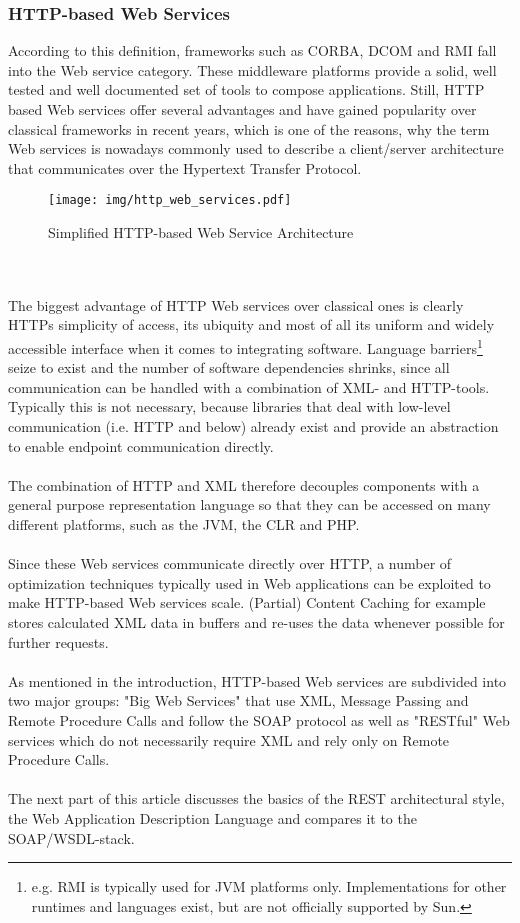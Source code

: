 \subsubsection*{HTTP-based Web Services}
According to this definition, frameworks such as CORBA, DCOM and RMI fall into the Web service category. These middleware platforms provide a solid, well tested and well documented set of tools to compose applications. Still, HTTP based Web services offer several advantages and have gained popularity over classical frameworks in recent years, which is one of the reasons, why the term Web services is nowadays commonly used to describe a client/server architecture that communicates over the Hypertext Transfer Protocol.
\begin{figure}[htp]
\centering
\texttt{[image: img/http\_web\_services.pdf]}
\caption{Simplified HTTP-based Web Service Architecture}\label{fig:erptsqfit}
\end{figure}
\\ \\
The biggest advantage of HTTP Web services over classical ones is clearly HTTPs simplicity of access, its ubiquity and most of all its uniform and widely accessible interface when it comes to integrating software. Language barriers\footnote{e.g. RMI is typically used for JVM platforms only. Implementations for other runtimes and languages exist, but are not officially supported by Sun.} seize to exist and the number of software dependencies shrinks, since all communication can be handled with a combination of XML- and HTTP-tools. Typically this is not necessary, because libraries that deal with low-level communication (i.e. HTTP and below) already exist and provide an abstraction to enable endpoint communication directly.
\\ \\
The combination of HTTP and XML therefore decouples components with a general purpose representation language so that they can be accessed on many different platforms, such as the JVM, the CLR and PHP.
\\ \\
Since these Web services communicate directly over HTTP, a number of optimization techniques typically used in Web applications can be exploited to make HTTP-based Web services scale. (Partial) Content Caching for example stores calculated XML data in buffers and re-uses the data whenever possible for further requests.
\\ \\
As mentioned in the introduction, HTTP-based Web services are subdivided into two major groups: "Big Web Services" that use XML, Message Passing and Remote Procedure Calls and follow the SOAP protocol as well as "RESTful" Web services which do not necessarily require XML and rely only on Remote Procedure Calls. 
\\ \\
The next part of this article discusses the basics of the REST architectural style, the Web Application Description Language and compares it to the SOAP/WSDL-stack.